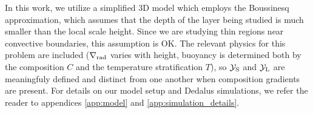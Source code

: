 In this work, we utilize a simplified 3D model which employs the Boussinesq approximation, which assumes that the depth of the layer being studied is much smaller than the local scale height.
Since we are studying thin regions near convective boundaries, this assumption is OK.
The relevant physics for this problem are included ($\nabla_{\rm{rad}}$ varies with height, buoyancy is determined both by the composition $C$ and the temperature stratification $T$), so $\mathcal{Y}_{\rm{S}}$ and $\mathcal{Y}_{\rm{L}}$ are meaningfuly defined and distinct from one another when composition gradients are present.
For details on our model setup and Dedalus simulations, we refer the reader to appendices \ref{app:model} and \ref{app:simulation_details}.
